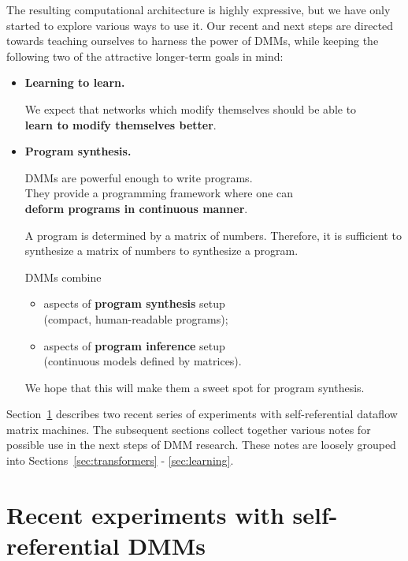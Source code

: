 \documentclass{article}
\newcommand{\msblue}[1]{{\color{myblue} #1}}
\begin{document}
The resulting computational architecture is highly expressive, but we have only started to explore various ways to use it.
Our recent and next steps are directed towards teaching ourselves to harness the power of DMMs, while keeping the following two of the attractive
longer-term goals in mind:

\begin{itemize}

\item {\bf Learning to learn.}

We expect that networks which modify themselves should be able to\\ \msblue{\bf learn to modify themselves better}.

\item {\bf Program synthesis.}

DMMs are powerful enough  to write programs.\\ They provide a programming framework where
one can\\ \msblue{\bf deform programs in continuous manner}.

A program is determined by a matrix of numbers. Therefore, it is
sufficient to synthesize a matrix of numbers to synthesize a program.


DMMs combine

\begin{itemize}

\item aspects of {\bf program synthesis} setup\\ (compact, human-readable programs);

\item aspects of {\bf program inference} setup\\ (continuous models defined by matrices).

\end{itemize}

We hope that this will make them a sweet spot for program synthesis.

\end{itemize}

Section~\ref{sec:recent} describes two recent series of experiments with self-referential dataflow matrix machines. The subsequent sections
collect together various notes for possible use in the next steps of DMM research. These notes are loosely grouped into Sections~\ref{sec:transformers} - \ref{sec:learning}.


\section{Recent experiments with self-referential DMMs}\label{sec:recent}
\end{document}
